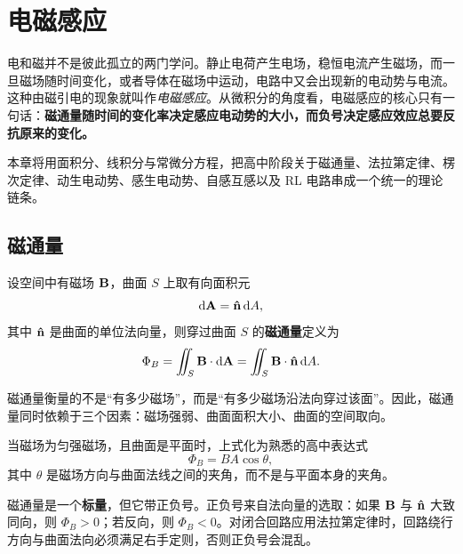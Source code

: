 \chapter{电磁感应}

电和磁并不是彼此孤立的两门学问。静止电荷产生电场，稳恒电流产生磁场，而一旦磁场随时间变化，或者导体在磁场中运动，电路中又会出现新的电动势与电流。这种由磁引电的现象就叫作\emph{电磁感应}。从微积分的角度看，电磁感应的核心只有一句话：\textbf{磁通量随时间的变化率决定感应电动势的大小，而负号决定感应效应总要反抗原来的变化。}

本章将用面积分、线积分与常微分方程，把高中阶段关于磁通量、法拉第定律、楞次定律、动生电动势、感生电动势、自感互感以及 RL 电路串成一个统一的理论链条。

\section{磁通量}

\begin{definition}
设空间中有磁场 $\vb{B}$，曲面 $S$ 上取有向面积元
\[
\dd \vb{A}=\vu{n}\,\dd A,
\]
其中 $\vu{n}$ 是曲面的单位法向量，则穿过曲面 $S$ 的\textbf{磁通量}定义为
\[
\Phi_B=\iint_S \vb{B}\cdot \dd \vb{A}=\iint_S \vb{B}\cdot \vu{n}\,\dd A.
\]
\end{definition}

磁通量衡量的不是“有多少磁场”，而是“有多少磁场沿法向穿过该面”。因此，磁通量同时依赖于三个因素：磁场强弱、曲面面积大小、曲面的空间取向。

当磁场为匀强磁场，且曲面是平面时，上式化为熟悉的高中表达式
\[
\Phi_B=BA\cos\theta,
\]
其中 $\theta$ 是磁场方向与曲面法线之间的夹角，而不是与平面本身的夹角。

\begin{remark}
磁通量是一个\textbf{标量}，但它带正负号。正负号来自法向量的选取：如果 $\vb{B}$ 与 $\vu{n}$ 大致同向，则 $\Phi_B>0$；若反向，则 $\Phi_B<0$。对闭合回路应用法拉第定律时，回路绕行方向与曲面法向必须满足右手定则，否则正负号会混乱。
\end{remark}

\begin{center}
\end{center}

